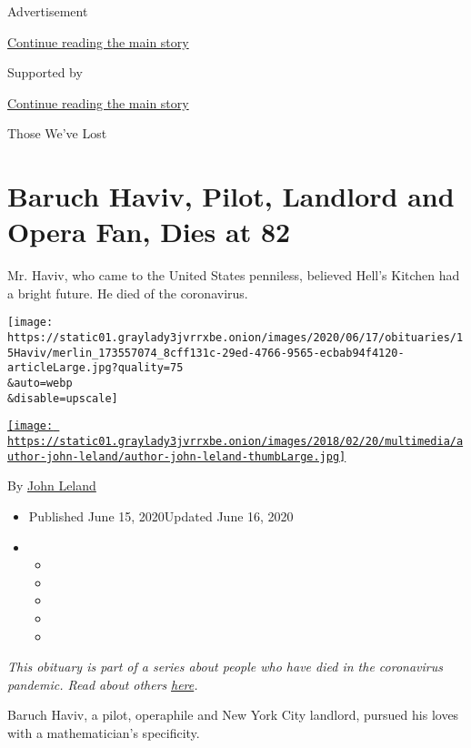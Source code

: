 Advertisement

\protect\hyperlink{after-top}{Continue reading the main story}

Supported by

\protect\hyperlink{after-sponsor}{Continue reading the main story}

Those We've Lost

\hypertarget{baruch-haviv-pilot-landlord-and-opera-fan-dies-at-82}{%
\section{Baruch Haviv, Pilot, Landlord and Opera Fan, Dies at
82}\label{baruch-haviv-pilot-landlord-and-opera-fan-dies-at-82}}

Mr. Haviv, who came to the United States penniless, believed Hell's
Kitchen had a bright future. He died of the coronavirus.

\texttt{[image: https://static01.graylady3jvrrxbe.onion/images/2020/06/17/obituaries/15Haviv/merlin\_173557074\_8cff131c-29ed-4766-9565-ecbab94f4120-articleLarge.jpg?quality=75\\\&auto=webp\\\&disable=upscale]}

\href{https://www.nytimes3xbfgragh.onion/by/john-leland}{\texttt{[image: https://static01.graylady3jvrrxbe.onion/images/2018/02/20/multimedia/author-john-leland/author-john-leland-thumbLarge.jpg]}}

By \href{https://www.nytimes3xbfgragh.onion/by/john-leland}{John Leland}

\begin{itemize}
\item
  Published June 15, 2020Updated June 16, 2020
\item
  \begin{itemize}
  \item
  \item
  \item
  \item
  \item
  \end{itemize}
\end{itemize}

\emph{This obituary is part of a series about people who have died in
the coronavirus pandemic. Read about others}
\href{https://www.nytimes3xbfgragh.onion/interactive/2020/obituaries/people-died-coronavirus-obituaries.html}{\emph{here}}\emph{.}

Baruch Haviv, a pilot, operaphile and New York City landlord, pursued
his loves with a mathematician's specificity.

